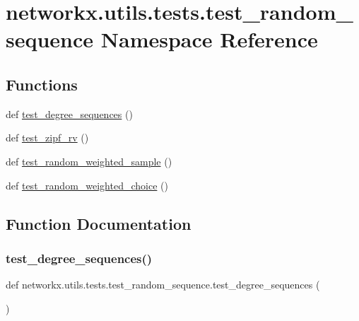 \hypertarget{namespacenetworkx_1_1utils_1_1tests_1_1test__random__sequence}{}\section{networkx.\+utils.\+tests.\+test\+\_\+random\+\_\+sequence Namespace Reference}
\label{namespacenetworkx_1_1utils_1_1tests_1_1test__random__sequence}
\subsection*{Functions}
\begin{DoxyCompactItemize}
\item 
def \hyperlink{namespacenetworkx_1_1utils_1_1tests_1_1test__random__sequence_a43674dc08697f7878851d6aed9f52646}{test\+\_\+degree\+\_\+sequences} ()
\item 
def \hyperlink{namespacenetworkx_1_1utils_1_1tests_1_1test__random__sequence_afdf5fe95c7aae3048f714a8baf009650}{test\+\_\+zipf\+\_\+rv} ()
\item 
def \hyperlink{namespacenetworkx_1_1utils_1_1tests_1_1test__random__sequence_a7c9b82fed0512d9d4fc504434e773157}{test\+\_\+random\+\_\+weighted\+\_\+sample} ()
\item 
def \hyperlink{namespacenetworkx_1_1utils_1_1tests_1_1test__random__sequence_ade3809bbb534e4fbfae5540b717eaebf}{test\+\_\+random\+\_\+weighted\+\_\+choice} ()
\end{DoxyCompactItemize}


\subsection{Function Documentation}
\mbox{\label{namespacenetworkx_1_1utils_1_1tests_1_1test__random__sequence_a43674dc08697f7878851d6aed9f52646}} 
\subsubsection{\texorpdfstring{test\+\_\+degree\+\_\+sequences()}{test\_degree\_sequences()}}
{\footnotesize\ttfamily def networkx.\+utils.\+tests.\+test\+\_\+random\+\_\+sequence.\+test\+\_\+degree\+\_\+sequences (\begin{DoxyParamCaption}{ }\end{DoxyParamCaption})}

